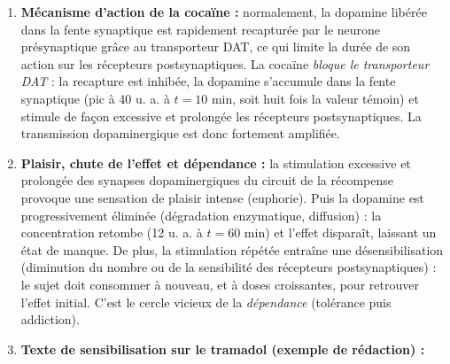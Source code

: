 \documentclass[11pt]{article}
\begin{document}
\begin{corrige}
\begin{enumerate}
\item \textbf{Mécanisme d'action de la cocaïne :} normalement, la dopamine libérée dans la fente synaptique est rapidement recapturée par le neurone présynaptique grâce au transporteur DAT, ce qui limite la durée de son action sur les récepteurs postsynaptiques. La cocaïne \emph{bloque le transporteur DAT} : la recapture est inhibée, la dopamine s'accumule dans la fente synaptique (pic à 40 u. a. à $t = 10$ min, soit huit fois la valeur témoin) et stimule de façon excessive et prolongée les récepteurs postsynaptiques. La transmission dopaminergique est donc fortement amplifiée.
\item \textbf{Plaisir, chute de l'effet et dépendance :} la stimulation excessive et prolongée des synapses dopaminergiques du circuit de la récompense provoque une sensation de plaisir intense (euphorie). Puis la dopamine est progressivement éliminée (dégradation enzymatique, diffusion) : la concentration retombe (12 u. a. à $t = 60$ min) et l'effet disparaît, laissant un état de manque. De plus, la stimulation répétée entraîne une désensibilisation (diminution du nombre ou de la sensibilité des récepteurs postsynaptiques) : le sujet doit consommer à nouveau, et à doses croissantes, pour retrouver l'effet initial. C'est le cercle vicieux de la \emph{dépendance} (tolérance puis addiction).
\item \textbf{Texte de sensibilisation sur le tramadol (exemple de rédaction) :}


\end{enumerate}
\end{corrige}
\end{document}
